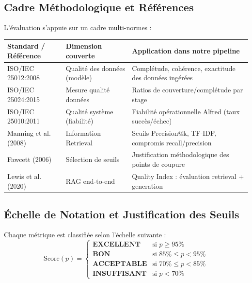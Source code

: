 \documentclass[12pt,a4paper]{report}
\begin{document}
\subsection{Cadre Méthodologique et Références}

L'évaluation s'appuie sur un cadre multi-normes :

\begin{longtable}{p{4cm}p{4cm}p{5.5cm}}
\toprule
\textbf{Standard / Référence} & \textbf{Dimension couverte} & \textbf{Application dans notre pipeline} \\
\midrule
ISO/IEC 25012:2008 \cite{iso25012} & Qualité des données (modèle) & Complétude, cohérence, exactitude des données ingérées \\
ISO/IEC 25024:2015 \cite{iso25024} & Mesure qualité données & Ratios de couverture/complétude par stage \\
ISO/IEC 25010:2011 \cite{iso25010} & Qualité système (fiabilité) & Fiabilité opérationnelle Alfred (taux succès/échec) \\
Manning et al. (2008) \cite{manning2008ir} & Information Retrieval & Seuils Precision@k, TF-IDF, compromis recall/precision \\
Fawcett (2006) \cite{fawcett2006roc} & Sélection de seuils & Justification méthodologique des points de coupure \\
Lewis et al. (2020) \cite{lewis2020rag} & RAG end-to-end & Quality Index : évaluation retrieval + generation \\
\bottomrule
\end{longtable}

\subsection{Échelle de Notation et Justification des Seuils}
\label{sec:seuils_notation}

Chaque métrique est classifiée selon l'échelle suivante :
\begin{equation}
\text{Score}(p) = \begin{cases}
    \textbf{EXCELLENT} & \text{si } p \geq 95\% \\
    \textbf{BON} & \text{si } 85\% \leq p < 95\% \\
    \textbf{ACCEPTABLE} & \text{si } 70\% \leq p < 85\% \\
    \textbf{INSUFFISANT} & \text{si } p < 70\%
\end{cases}
\label{eq:score_scale}
\end{equation}
\end{document}
